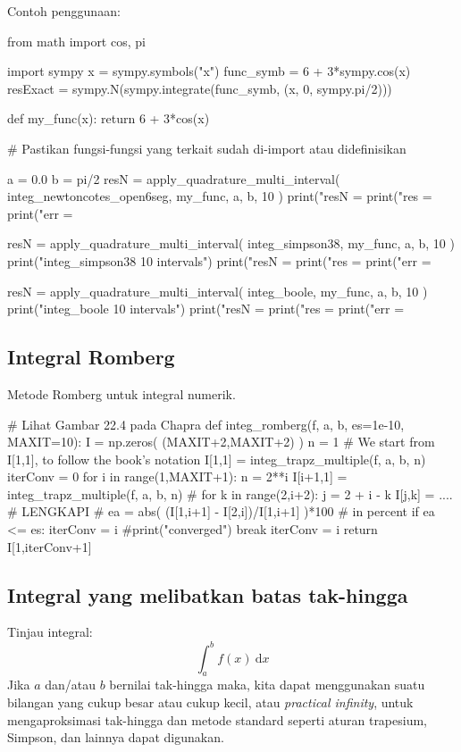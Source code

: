 \documentclass[a4paper,11pt,bahasa]{article} %
\begin{document}
Contoh penggunaan:
\begin{pythoncode}
from math import cos, pi

import sympy
x = sympy.symbols("x")
func_symb = 6 + 3*sympy.cos(x)
resExact = sympy.N(sympy.integrate(func_symb, (x, 0, sympy.pi/2)))

def my_func(x):
    return 6 + 3*cos(x)

# Pastikan fungsi-fungsi yang terkait sudah di-import atau didefinisikan

a = 0.0
b = pi/2
resN = apply_quadrature_multi_interval(
    integ_newtoncotes_open6seg, my_func, a, b, 10
)
print("resN = %
print("res  = %
print("err  = %

resN = apply_quadrature_multi_interval(
    integ_simpson38, my_func, a, b, 10
)
print("\nUsing integ_simpson38 10 intervals")
print("resN = %
print("res  = %
print("err  = %

resN = apply_quadrature_multi_interval(
    integ_boole, my_func, a, b, 10
)
print("\nUsing integ_boole 10 intervals")
print("resN = %
print("res  = %
print("err  = %
\end{pythoncode}

\subsection*{Integral Romberg}
Metode Romberg untuk integral numerik.
\begin{pythoncode}
# Lihat Gambar 22.4 pada Chapra
def integ_romberg(f, a, b, es=1e-10, MAXIT=10):
    I = np.zeros( (MAXIT+2,MAXIT+2) )
    n = 1
    # We start from I[1,1], to follow the book's notation
    I[1,1] = integ_trapz_multiple(f, a, b, n)
    iterConv = 0
    for i in range(1,MAXIT+1):
        n = 2**i
        I[i+1,1] = integ_trapz_multiple(f, a, b, n)
        #
        for k in range(2,i+2):
            j = 2 + i - k
            I[j,k] = .... # LENGKAPI
        #
        ea = abs( (I[1,i+1] - I[2,i])/I[1,i+1] )*100 # in percent
        if ea <= es:
            iterConv = i
            #print("converged")
            break
        iterConv = i
    return I[1,iterConv+1]
\end{pythoncode}


\subsection*{Integral yang melibatkan batas tak-hingga}
Tinjau integral:
\begin{equation}
\int_{a}^{b} f(x)\ \mathrm{d}x
\label{eq:orig_integ}
\end{equation}
Jika $a$ dan/atau $b$ bernilai tak-hingga maka, kita dapat menggunakan suatu bilangan
yang cukup besar atau cukup kecil, atau \textit{practical infinity},
untuk mengaproksimasi tak-hingga dan metode
standard seperti aturan trapesium, Simpson, dan lainnya dapat digunakan.
\end{document}
